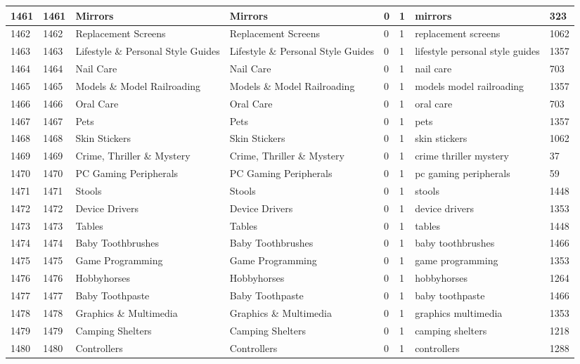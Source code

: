 \begin{longtable}{|l|l|l|l|l|l|l|l|}
1461 & 1461 & Mirrors & Mirrors & 0 & 1 & mirrors & 323 \\ \hline 
1462 & 1462 & Replacement Screens & Replacement Screens & 0 & 1 & replacement screens & 1062 \\ \hline 
1463 & 1463 & Lifestyle \& Personal Style Guides & Lifestyle \& Personal Style Guides & 0 & 1 & lifestyle personal style guides & 1357 \\ \hline 
1464 & 1464 & Nail Care & Nail Care & 0 & 1 & nail care & 703 \\ \hline 
1465 & 1465 & Models \& Model Railroading & Models \& Model Railroading & 0 & 1 & models model railroading & 1357 \\ \hline 
1466 & 1466 & Oral Care & Oral Care & 0 & 1 & oral care & 703 \\ \hline 
1467 & 1467 & Pets & Pets & 0 & 1 & pets & 1357 \\ \hline 
1468 & 1468 & Skin Stickers & Skin Stickers & 0 & 1 & skin stickers & 1062 \\ \hline 
1469 & 1469 & Crime, Thriller \& Mystery & Crime, Thriller \& Mystery & 0 & 1 & crime thriller mystery & 37 \\ \hline 
1470 & 1470 & PC Gaming Peripherals & PC Gaming Peripherals & 0 & 1 & pc gaming peripherals & 59 \\ \hline 
1471 & 1471 & Stools & Stools & 0 & 1 & stools & 1448 \\ \hline 
1472 & 1472 & Device Drivers & Device Drivers & 0 & 1 & device drivers & 1353 \\ \hline 
1473 & 1473 & Tables & Tables & 0 & 1 & tables & 1448 \\ \hline 
1474 & 1474 & Baby Toothbrushes & Baby Toothbrushes & 0 & 1 & baby toothbrushes & 1466 \\ \hline 
1475 & 1475 & Game Programming & Game Programming & 0 & 1 & game programming & 1353 \\ \hline 
1476 & 1476 & Hobbyhorses & Hobbyhorses & 0 & 1 & hobbyhorses & 1264 \\ \hline 
1477 & 1477 & Baby Toothpaste & Baby Toothpaste & 0 & 1 & baby toothpaste & 1466 \\ \hline 
1478 & 1478 & Graphics \& Multimedia & Graphics \& Multimedia & 0 & 1 & graphics multimedia & 1353 \\ \hline 
1479 & 1479 & Camping Shelters & Camping Shelters & 0 & 1 & camping shelters & 1218 \\ \hline 
1480 & 1480 & Controllers & Controllers & 0 & 1 & controllers & 1288 \\ \hline 

\end{longtable}
